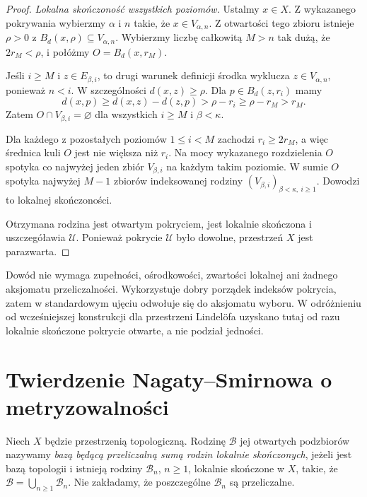 \begin{proof}
\emph{Lokalna skończoność wszystkich poziomów.}
Ustalmy $x\in X$. Z wykazanego
pokrywania wybierzmy $\alpha$ i $n$
takie, że $x\in V_{\alpha,n}$.
Z otwartości tego zbioru istnieje
$\rho>0$ z
$B_d(x,\rho)\subseteq V_{\alpha,n}$.
Wybierzmy liczbę całkowitą $M>n$
tak dużą, że $2r_M<\rho$,
i połóżmy $O=B_d(x,r_M)$.

Jeśli $i\ge M$ i
$z\in E_{\beta,i}$, to
drugi warunek definicji środka
wyklucza $z\in V_{\alpha,n}$,
ponieważ $n<i$.
W szczególności $d(x,z)\ge\rho$.
Dla $p\in B_d(z,r_i)$ mamy
\[
d(x,p)\ge d(x,z)-d(z,p)
>\rho-r_i\ge\rho-r_M>r_M.
\]
Zatem $O\cap V_{\beta,i}=\varnothing$
dla wszystkich $i\ge M$ i
$\beta<\kappa$.

Dla każdego z pozostałych poziomów
$1\le i<M$ zachodzi
$r_i\ge 2r_M$, a więc
średnica kuli $O$ jest nie większa
niż $r_i$. Na mocy wykazanego
rozdzielenia $O$ spotyka
co najwyżej jeden zbiór
$V_{\beta,i}$ na każdym takim poziomie.
W sumie $O$ spotyka najwyżej
$M-1$ zbiorów indeksowanej
rodziny $(V_{\beta,i})_{\beta<\kappa,\ i\ge1}$.
Dowodzi to lokalnej skończoności.

Otrzymana rodzina jest otwartym
pokryciem, jest lokalnie skończona
i uszczegóławia $\mathcal U$.
Ponieważ pokrycie $\mathcal U$ było
dowolne, przestrzeń $X$ jest parazwarta.
\end{proof}

\begin{uwaga}
Dowód nie wymaga zupełności, ośrodkowości,
zwartości lokalnej ani żadnego aksjomatu
przeliczalności. Wykorzystuje
dobry porządek indeksów pokrycia,
zatem w standardowym ujęciu odwołuje
się do aksjomatu wyboru. W odróżnieniu
od wcześniejszej konstrukcji dla
przestrzeni Lindelöfa uzyskano tutaj
od razu lokalnie skończone pokrycie
otwarte, a nie podział jedności.
\end{uwaga}


\section{Twierdzenie Nagaty--Smirnowa o metryzowalności}
\label{sec:topog-parazwartosc-nagata-smirnow}

\begin{definicja}
\label{def:topog-parazwartosc-sigma-lokalnie-skonczona-baza}
Niech $X$ będzie przestrzenią topologiczną.
Rodzinę $\mathcal B$ jej otwartych podzbiorów
nazywamy \emph{bazą będącą przeliczalną sumą
rodzin lokalnie skończonych}, jeżeli jest bazą
topologii i istnieją rodziny
$\mathcal B_n$, $n\ge1$, lokalnie skończone
w $X$, takie, że
$\mathcal B=\bigcup_{n\ge1}\mathcal B_n$.
Nie zakładamy, że poszczególne
$\mathcal B_n$ są przeliczalne.
\end{definicja}

